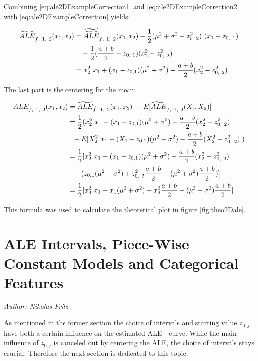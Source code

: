 \documentclass[
]{krantz}
\begin{document}
Combining \eqref{eq:ale2DExampleCorrection1} and \eqref{eq:ale2DExampleCorrection2} with \eqref{eq:ale2DExampleCorrection} yields:

\begin{align} 
\widetilde{ALE}_{\hat{f},~1,~2}(x_1, x_2) 
&= \widetilde{\widetilde{ALE}}_{\hat{f},~1,~2}(x_1, x_2) - \frac{1}{2}(\mu^2 + \sigma^2 - z_{0,~2}^2)~(x_1 - z_{0,~1}) \notag \\
& ~~~ - \frac{1}{2}(\frac{a+b}{2} - z_{0, ~1})(x_2^2 - z_{0, ~2}^2) \notag \\
&= x_2^2~x_1 + (x_1 - z_{0,1})(\mu^2+\sigma^2) - \frac{a + b}{2}(x_2^2-z_{0,~2}^2)
\end{align}

The last part is the centering for the mean:

\begin{align} 
ALE_{\hat{f},~1,~2}(x_1, x_2) &= \widetilde{ALE}_{\hat{f},~1,~2}(x_1, x_2) ~ -  E[\widetilde{ALE}_{\hat{f},~1,~2}(X_1, X_2)] \notag \\
&= \frac{1}{2} (x_2^2~x_1 + (x_1 - z_{0,1})(\mu^2+\sigma^2) - \frac{a + b}{2}(x_2^2-z_{0,~2}^2) \notag \\
& ~~ - E[X_2^2~x_1 + (X_1 - z_{0,1})(\mu^2+\sigma^2) - \frac{a + b}{2}(X_2^2-z_{0,~2}^2)] ) \notag \\
&= \frac{1}{2} [x_2^2~x_1 - (x_1 - z_{0,1})(\mu^2+\sigma^2) - \frac{a + b}{2}(x_2^2-z_{0,~2}^2) \notag \\
& ~~ - (z_{0,1}(\mu^2+\sigma^2) + z_{0,~2}^2 \frac{a + b}{2} - (\mu^2+\sigma^2) \frac{a + b}{2}) ] \notag \\
&= \frac{1}{2} [x_2^2~x_1 - x_1(\mu^2+\sigma^2) - x_2^2 \frac{a + b}{2} + (\mu^2+\sigma^2) \frac{a + b}{2} ]
\end{align}

This formula was used to calculate the theoretical plot in figure \ref{fig:theo2Dale}.

\hypertarget{ale-intervals-piece-wise-constant-models-and-categorical-features}{%
\chapter{ALE Intervals, Piece-Wise Constant Models and Categorical Features}\label{ale-intervals-piece-wise-constant-models-and-categorical-features}}

\emph{Author: Nikolas Fritz}

As mentioned in the former section the choice of intervals and starting value \(z_{0,j}\) have both a certain influence on the estimated ALE - curve. While the main influence of \(z_{0,j}\) is canceled out by centering the ALE, the choice of intervals stays crucial. Therefore the next section is dedicated to this topic.
\end{document}
